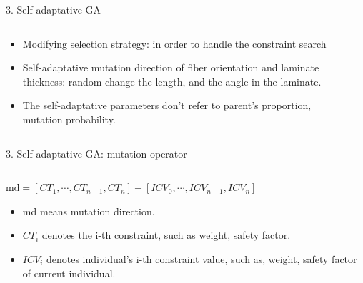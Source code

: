 \documentclass{beamer}
\begin{document}
\begin{frame}{3. Self-adaptative GA}
    \begin{columns}[c]
    \begin{column}{1\textwidth}
		\begin{itemize}
			\item Modifying selection strategy: in order to handle the constraint search
			\item Self-adaptative mutation direction of fiber orientation and laminate thickness:
				random change the length, and the angle in the laminate.
			\item The self-adaptative parameters don't refer to parent's proportion, mutation
				probability.
		\end{itemize}
    \end{column}
    \begin{column}{0.8\textwidth}

    \end{column}
\end{columns}
\end{frame}


\begin{frame}{3. Self-adaptative GA:  mutation operator}
    \begin{columns}[c]
    \begin{column}{1\textwidth}
		$\text{md} = [CT_1, \cdots, CT_{n-1}, CT_n] -  [ICV_0, \cdots, ICV_{n-1},
		ICV_n]$ \\
		\begin{itemize}
			\item  md means mutation direction.
			\item  $CT_i$ denotes the i-th constraint, such as weight, safety factor.
			\item  $ICV_i$ denotes individual's i-th constraint value, such as,  weight, safety
				factor of current individual.
		\end{itemize}

    \end{column}
\end{columns}
\end{frame}
\end{document}
